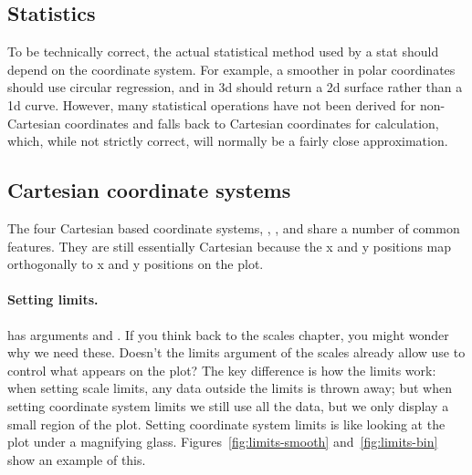 \subsection{Statistics}
\label{sub:statistics}

To be technically correct, the actual statistical method used by a stat should depend on the coordinate system.  For example, a smoother in polar coordinates should use circular regression, and in 3d should return a 2d surface rather than a 1d curve.  However, many statistical operations have not been derived for non-Cartesian coordinates and \ggplot falls back to Cartesian coordinates for calculation, which, while not strictly correct, will normally be a fairly close approximation.

\subsection{Cartesian coordinate systems}
\label{sub:cartesian}

The four Cartesian based coordinate systems, , ,  and  share a number of common features.  They are still essentially Cartesian because the x and y positions map orthogonally to x and y positions on the plot.  

\paragraph{Setting limits.}   has arguments  and .  If you think back to the scales chapter, you might wonder why we need these.  Doesn't the limits argument of the scales already allow use to control what appears on the plot?  The key difference is how the limits work: when setting scale limits, any data outside the limits is thrown away; but when setting coordinate system limits we still use all the data, but we only display a small region of the plot.  Setting coordinate system limits is like looking at the plot under a magnifying glass.  Figures~\ref{fig:limits-smooth} and~\ref{fig:limits-bin} show an example of this.

% 


